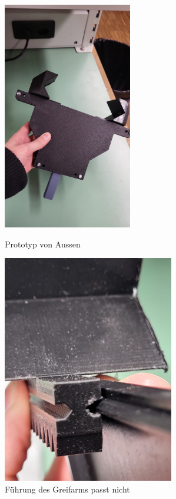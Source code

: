 \documentclass[../main.tex]{subfiles}
\begin{document}
\begin{figure}[h!]
    \centering
    \begin{minipage}[t]{0.45\textwidth}
        \centering
        \includegraphics[height=10cm]{img/greifarmtest/prototyp_test_fertig.jpeg}
        \caption{Prototyp von Aussen}
        \label{fig:hardware_test_fertig}
    \end{minipage}%
    \hfill
    \begin{minipage}[t]{0.45\textwidth}
        \centering
        \includegraphics[height=10cm]{img/greifarmtest/prototyp_test_klemmen_gleiten.jpeg}
        \caption{Führung des Greifarms passt nicht}
        \label{fig:hardware_test_klemmen_gleiten}
    \end{minipage}
\end{figure}
\end{document}
